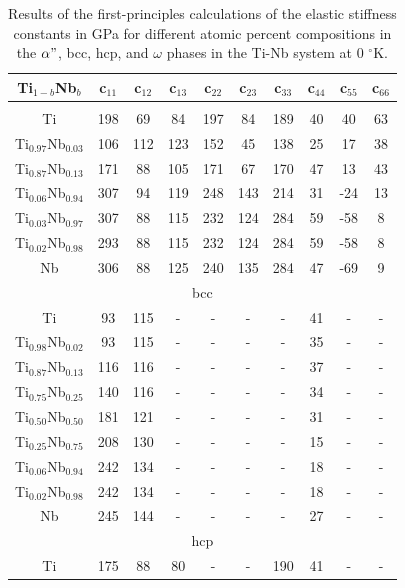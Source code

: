 \newpage
\begin{longtable}[H]{ c c c c c c c c c c }
	\caption{Results of the first-principles calculations of the elastic stiffness constants in GPa for different atomic percent compositions in the $\alpha"$, bcc, hcp, and $\omega$  phases in the Ti-Nb system at 0 $^\circ$K.} 	\label{Ch7-table:tinbdata} \\
	\hline
	Ti$_{1-b}$Nb$_b$ & c$_{11}$ & c$_{12}$ & c$_{13}$ & c$_{22}$ & c$_{23}$ & c$_{33}$ & c$_{44}$ & c$_{55}$ & c$_{66}$\\
	\hline
	\endhead
	\hline
	\endfoot
	\multicolumn{10}{c}{$\alpha"$}\\
	\hline
	Ti & 198 & 69 & 84 & 197 & 84 & 189 & 40 & 40 & 63 \\		
	Ti$_{0.97}$Nb$_{0.03}$ & 106 & 112 & 123 & 152 & 45 & 138 & 25 & 17 & 38 \\
	Ti$_{0.87}$Nb$_{0.13}$ & 171 & 88 & 105 & 171 & 67 & 170 & 47 & 13 & 43 \\
	Ti$_{0.06}$Nb$_{0.94}$ & 307 & 94 & 119 & 248 & 143 & 214 & 31 & -24 & 13 \\
	Ti$_{0.03}$Nb$_{0.97}$ & 307 & 88 & 115 & 232 & 124 & 284 & 59 & -58 & 8 \\
	Ti$_{0.02}$Nb$_{0.98}$ & 293 & 88 & 115 & 232 & 124 & 284 & 59 & -58 & 8 \\
	Nb & 306 & 88 & 125 & 240 & 135 & 284 & 47 & -69 & 9 \\
	\hline
	\multicolumn{10}{c}{bcc}\\
	\hline
	Ti & 93 & 115 & - & - & - & - & 41 & - & - \\		
	Ti$_{0.98}$Nb$_{0.02}$ & 93 & 115 & - & - & - & - & 35 & - & - \\
	Ti$_{0.87}$Nb$_{0.13}$ & 116 & 116 & - & - & - & - & 37 & - & - \\
	Ti$_{0.75}$Nb$_{0.25}$ & 140 & 116 & - & - & - & - & 34 & - & - \\
	Ti$_{0.50}$Nb$_{0.50}$ & 181 & 121 & - & - & - & - & 31 & - & - \\
	Ti$_{0.25}$Nb$_{0.75}$ & 208 & 130 & - & - & - & - & 15 & - & - \\
	Ti$_{0.06}$Nb$_{0.94}$ & 242 & 134 & - & - & - & - & 18 & - & - \\
	Ti$_{0.02}$Nb$_{0.98}$ & 242 & 134 & - & - & - & - & 18 & - & - \\
	Nb & 245 & 144 & - & - & - & - & 27 & - & - \\
	\hline
	\multicolumn{10}{c}{hcp}\\
	\hline
	Ti & 175 & 88 & 80 & - & - & 190 & 41 & - & - \\		

\end{longtable}
